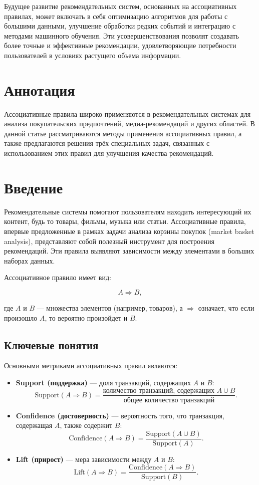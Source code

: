 Будущее развитие рекомендательных систем, основанных на ассоциативных правилах, может включать в себя оптимизацию алгоритмов для работы с большими данными, улучшение обработки редких событий и интеграцию с методами машинного обучения. Эти усовершенствования позволят создавать более точные и эффективные рекомендации, удовлетворяющие потребности пользователей в условиях растущего объема информации.

\section*{Аннотация}
Ассоциативные правила широко применяются в рекомендательных системах для анализа покупательских предпочтений, медиа-рекомендаций и других областей. В данной статье рассматриваются методы применения ассоциативных правил, а также предлагаются решения трёх специальных задач, связанных с использованием этих правил для улучшения качества рекомендаций.

\tableofcontents

\newpage

\section{Введение}
Рекомендательные системы помогают пользователям находить интересующий их контент, будь то товары, фильмы, музыка или статьи. Ассоциативные правила, впервые предложенные в рамках задачи анализа корзины покупок (market basket analysis), представляют собой полезный инструмент для построения рекомендаций. Эти правила выявляют зависимости между элементами в больших наборах данных.

Ассоциативное правило имеет вид:

\begin{equation}
A \Rightarrow B,
\end{equation}

где $A$ и $B$ — множества элементов (например, товаров), а $\Rightarrow$ означает, что если произошло $A$, то вероятно произойдет и $B$.

\subsection{Ключевые понятия}

Основными метриками ассоциативных правил являются:

\begin{itemize}
  \item \textbf{Support (поддержка)} — доля транзакций, содержащих $A$ и $B$:
    \[\text{Support}(A \Rightarrow B) = \frac{\text{количество транзакций, содержащих } A \cup B}{\text{общее количество транзакций}}.\]
  \item \textbf{Confidence (достоверность)} — вероятность того, что транзакция, содержащая $A$, также содержит $B$:
    \[\text{Confidence}(A \Rightarrow B) = \frac{\text{Support}(A \cup B)}{\text{Support}(A)}.\]
  \item \textbf{Lift (прирост)} — мера зависимости между $A$ и $B$:
    \[\text{Lift}(A \Rightarrow B) = \frac{\text{Confidence}(A \Rightarrow B)}{\text{Support}(B)}.\]
\end{itemize}

